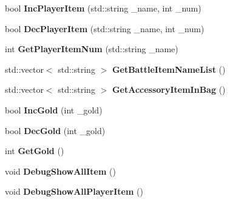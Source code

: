\begin{DoxyCompactItemize}
\item 
bool {\bfseries Inc\+Player\+Item} (std\+::string \+\_\+name, int \+\_\+num)\hypertarget{class_c_item_manager_ae3f58e5d1dfcf85ebbc902128c8480ba}{}\label{class_c_item_manager_ae3f58e5d1dfcf85ebbc902128c8480ba}

\item 
bool {\bfseries Dec\+Player\+Item} (std\+::string \+\_\+name, int \+\_\+num)\hypertarget{class_c_item_manager_a9c1ba5359ffb008e6711b94d6696b1bd}{}\label{class_c_item_manager_a9c1ba5359ffb008e6711b94d6696b1bd}

\item 
int {\bfseries Get\+Player\+Item\+Num} (std\+::string \+\_\+name)\hypertarget{class_c_item_manager_affaa65031e648d9bc1a09c4258896618}{}\label{class_c_item_manager_affaa65031e648d9bc1a09c4258896618}

\item 
std\+::vector$<$ std\+::string $>$ {\bfseries Get\+Battle\+Item\+Name\+List} ()\hypertarget{class_c_item_manager_aa55d93d60045df5836e39df57866f842}{}\label{class_c_item_manager_aa55d93d60045df5836e39df57866f842}

\item 
std\+::vector$<$ std\+::string $>$ {\bfseries Get\+Accessory\+Item\+In\+Bag} ()\hypertarget{class_c_item_manager_a933fef668671a7145c52fbfe8b83561e}{}\label{class_c_item_manager_a933fef668671a7145c52fbfe8b83561e}

\item 
bool {\bfseries Inc\+Gold} (int \+\_\+gold)\hypertarget{class_c_item_manager_a9f21c82114045d9d47c63c7325f8cfc7}{}\label{class_c_item_manager_a9f21c82114045d9d47c63c7325f8cfc7}

\item 
bool {\bfseries Dec\+Gold} (int \+\_\+gold)\hypertarget{class_c_item_manager_a4b1ae73faf089194a4220263aea1e836}{}\label{class_c_item_manager_a4b1ae73faf089194a4220263aea1e836}

\item 
int {\bfseries Get\+Gold} ()\hypertarget{class_c_item_manager_aafa5c2e6278ff7d4af4bf603786af6c8}{}\label{class_c_item_manager_aafa5c2e6278ff7d4af4bf603786af6c8}

\item 
void {\bfseries Debug\+Show\+All\+Item} ()\hypertarget{class_c_item_manager_aea4544fbfc0ea5b040c52191416b6d79}{}\label{class_c_item_manager_aea4544fbfc0ea5b040c52191416b6d79}

\item 
void {\bfseries Debug\+Show\+All\+Player\+Item} ()\hypertarget{class_c_item_manager_a38fe8717821d31cde98f38932db474af}{}\label{class_c_item_manager_a38fe8717821d31cde98f38932db474af}

\end{DoxyCompactItemize}

